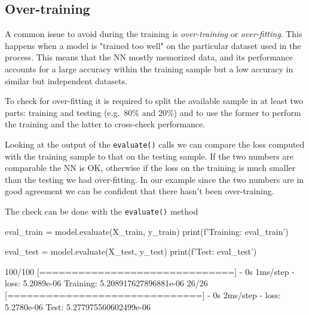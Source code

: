 \subsection{Over-training}
\label{sec:overtraining}
A common issue to avoid during the training is \emph{over-training} or \emph{over-fitting}. 
This happens when a model is "trained too well" on the particular dataset used in the process. This means that the NN mostly memorized data, and its performance accounts for a large accuracy within the training sample but a low accuracy in similar but independent datasets. 

To check for over-fitting it is required to split the available sample in at least two parts: training and testing (e.g.~80\% and 20\%) and to use the former to perform the training and the latter to cross-check performance.


Looking at the output of the \texttt{evaluate()} calls we can compare the loss computed with the training sample to that on the testing sample. If the two numbers are comparable the NN is OK, otherwise if the loss on the training is much smaller than the testing we had over-fitting.
In our example since the two numbers are in good agreement we can be confident that there hasn't been over-training.

The check can be done with the \texttt{evaluate()} method

\begin{ipythonnon}
eval_train = model.evaluate(X_train, y_train)
print(f'Training: {eval_train}')

eval_test = model.evaluate(X_test, y_test)
print(f'Test: {eval_test}')
\end{ipythonnon}
\begin{ioutput}
100/100 [==============================] - 0s 1ms/step - loss: 5.2089e-06
Training: 5.208917627896881e-06
26/26 [==============================] - 0s 2ms/step - loss: 5.2780e-06
Test: 5.277975560602499e-06
\end{ioutput}

